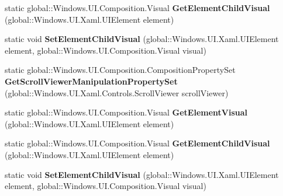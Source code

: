 \begin{DoxyCompactItemize}
\mbox{\label{class_windows_1_1_u_i_1_1_xaml_1_1_hosting_1_1_element_composition_preview_a8187f1a70143d04232934a796b4099ef}} 
static global\+::\+Windows.\+U\+I.\+Composition.\+Visual {\bfseries Get\+Element\+Child\+Visual} (global\+::\+Windows.\+U\+I.\+Xaml.\+U\+I\+Element element)
\item 
\mbox{\label{class_windows_1_1_u_i_1_1_xaml_1_1_hosting_1_1_element_composition_preview_a214faabff7d601f8d727a4b0f000f677}} 
static void {\bfseries Set\+Element\+Child\+Visual} (global\+::\+Windows.\+U\+I.\+Xaml.\+U\+I\+Element element, global\+::\+Windows.\+U\+I.\+Composition.\+Visual visual)
\item 
\mbox{\label{class_windows_1_1_u_i_1_1_xaml_1_1_hosting_1_1_element_composition_preview_a97dcf75bcb6cd9ebb00b1029e9dc2b7d}} 
static global\+::\+Windows.\+U\+I.\+Composition.\+Composition\+Property\+Set {\bfseries Get\+Scroll\+Viewer\+Manipulation\+Property\+Set} (global\+::\+Windows.\+U\+I.\+Xaml.\+Controls.\+Scroll\+Viewer scroll\+Viewer)
\item 
\mbox{\label{class_windows_1_1_u_i_1_1_xaml_1_1_hosting_1_1_element_composition_preview_a197394bc43fd737a554e4e888ca99c71}} 
static global\+::\+Windows.\+U\+I.\+Composition.\+Visual {\bfseries Get\+Element\+Visual} (global\+::\+Windows.\+U\+I.\+Xaml.\+U\+I\+Element element)
\item 
\mbox{\label{class_windows_1_1_u_i_1_1_xaml_1_1_hosting_1_1_element_composition_preview_a8187f1a70143d04232934a796b4099ef}} 
static global\+::\+Windows.\+U\+I.\+Composition.\+Visual {\bfseries Get\+Element\+Child\+Visual} (global\+::\+Windows.\+U\+I.\+Xaml.\+U\+I\+Element element)
\item 
\mbox{\label{class_windows_1_1_u_i_1_1_xaml_1_1_hosting_1_1_element_composition_preview_a214faabff7d601f8d727a4b0f000f677}} 
static void {\bfseries Set\+Element\+Child\+Visual} (global\+::\+Windows.\+U\+I.\+Xaml.\+U\+I\+Element element, global\+::\+Windows.\+U\+I.\+Composition.\+Visual visual)

\end{DoxyCompactItemize}

